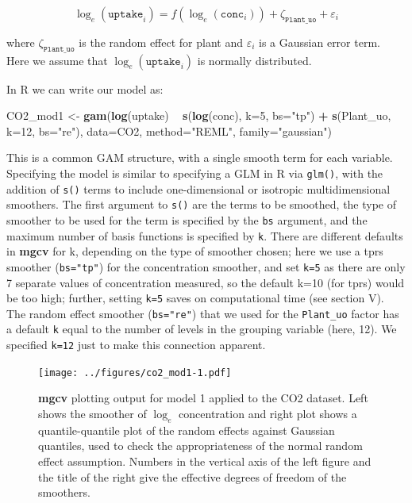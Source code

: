 \documentclass[12pt]{article}
\newenvironment{Shaded}{\begin{snugshade}}{\end{snugshade}}
\newcommand{\KeywordTok}[1]{\textcolor[rgb]{0.13,0.29,0.53}{\textbf{#1}}}
\newcommand{\DataTypeTok}[1]{\textcolor[rgb]{0.13,0.29,0.53}{#1}}
\newcommand{\DecValTok}[1]{\textcolor[rgb]{0.00,0.00,0.81}{#1}}
\newcommand{\StringTok}[1]{\textcolor[rgb]{0.31,0.60,0.02}{#1}}
\newcommand{\OperatorTok}[1]{\textcolor[rgb]{0.81,0.36,0.00}{\textbf{#1}}}
\newcommand{\NormalTok}[1]{#1}
\begin{document}
\[
\log_e(\texttt{uptake}_i) = f(\log_e(\texttt{conc}_i)) + \zeta_\texttt{Plant\_uo} + \varepsilon_i
\]

where \(\zeta_\texttt{Plant\_uo}\) is the random effect for plant and
\(\varepsilon_i\) is a Gaussian error term. Here we assume that
\(\log_e(\texttt{uptake}_i)\) is normally distributed.

In R we can write our model as:

\begin{Shaded}
\begin{Highlighting}[]
\NormalTok{CO2_mod1 <-}\StringTok{ }\KeywordTok{gam}\NormalTok{(}\KeywordTok{log}\NormalTok{(uptake) }\OperatorTok{~}\StringTok{ }\KeywordTok{s}\NormalTok{(}\KeywordTok{log}\NormalTok{(conc), }\DataTypeTok{k=}\DecValTok{5}\NormalTok{, }\DataTypeTok{bs=}\StringTok{"tp"}\NormalTok{) }\OperatorTok{+}
\StringTok{                  }\KeywordTok{s}\NormalTok{(Plant_uo, }\DataTypeTok{k=}\DecValTok{12}\NormalTok{, }\DataTypeTok{bs=}\StringTok{"re"}\NormalTok{),}
                \DataTypeTok{data=}\NormalTok{CO2, }\DataTypeTok{method=}\StringTok{"REML"}\NormalTok{, }\DataTypeTok{family=}\StringTok{"gaussian"}\NormalTok{)}
\end{Highlighting}
\end{Shaded}

This is a common GAM structure, with a single smooth term for each
variable. Specifying the model is similar to specifying a GLM in R via
\texttt{glm()}, with the addition of \texttt{s()} terms to include
one-dimensional or isotropic multidimensional smoothers. The first
argument to \texttt{s()} are the terms to be smoothed, the type of
smoother to be used for the term is specified by the \texttt{bs}
argument, and the maximum number of basis functions is specified by
\texttt{k}. There are different defaults in \textbf{mgcv} for k,
depending on the type of smoother chosen; here we use a tprs smoother
(\texttt{bs="tp"}) for the concentration smoother, and set \texttt{k=5}
as there are only 7 separate values of concentration measured, so the
default k=10 (for tprs) would be too high; further, setting \texttt{k=5}
saves on computational time (see section V). The random effect smoother
(\texttt{bs="re"}) that we used for the \texttt{Plant\_uo} factor has a
default \texttt{k} equal to the number of levels in the grouping
variable (here, 12). We specified \texttt{k=12} just to make this
connection apparent.

\begin{figure}
\centering
\texttt{[image: ../figures/co2\_mod1-1.pdf]}
\caption{\label{fig:co2_mod1}\textbf{mgcv} plotting output for model 1
applied to the CO2 dataset. Left shows the smoother of \(\log_e\)
concentration and right plot shows a quantile-quantile plot of the
random effects against Gaussian quantiles, used to check the
appropriateness of the normal random effect assumption. Numbers in the
vertical axis of the left figure and the title of the right give the
effective degrees of freedom of the smoothers.}
\end{figure}
\end{document}
